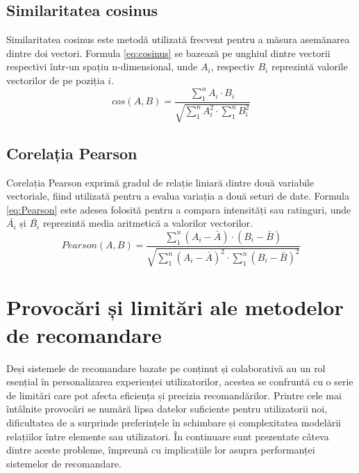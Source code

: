 \subsection{Similaritatea cosinus}
\label{subsec:ch3sec3sub2}
Similaritatea cosinus \cite{al2018similarity} este metodă utilizată frecvent pentru a măsura asemănarea dintre doi vectori. 
Formula \ref{eq:cosinus} se bazează pe unghiul dintre vectorii respectivi într-un spațiu n-dimensional, unde \(A_i\), respectiv \(B_i\) reprezintă valorile vectorilor de pe poziția \(i\).
\begin{equation}
    cos(A, B) = \frac{\sum_1^n A_i \cdot B_i}{\sqrt{\sum_1^n A_i^2 \cdot \sum_1^n B_i^2}}
    \label{eq:cosinus}
\end{equation}

\subsection{Corelația Pearson}
\label{subsec:ch3sec3sub3}
Corelația Pearson \cite{al2018similarity} exprimă gradul de relație liniară dintre două variabile vectoriale, fiind utilizată pentru a evalua variația a două seturi de date.
Formula \ref{eq:Pearson} este adesea folosită pentru a compara intensități sau ratinguri, unde \(\bar{A_i}\) și \(\bar{B_i}\) reprezintă media aritmetică a valorilor vectorilor.
\begin{equation}
    Pearson(A, B) = \frac{\sum_1^n (A_i - \bar{A}) \cdot (B_i - \bar{B})}{\sqrt{\sum_1^n (A_i - \bar{A})^2 \cdot \sum_1^n (B_i - \bar{B})^2}}
    \label{eq:Pearson}
\end{equation}


\section{Provocări și limitări ale metodelor de recomandare}
\label{sec:ch3sec4}
Deși sistemele de recomandare bazate pe conținut și colaborativă au un rol esențial în personalizarea experienței utilizatorilor, acestea se confruntă cu o serie de limitări care pot afecta eficiența și precizia recomandărilor. 
Printre cele mai întâlnite provocări se numără lipsa datelor suficiente pentru utilizatorii noi, dificultatea de a surprinde preferințele în schimbare și complexitatea modelării relațiilor între elemente sau utilizatori. 
În continuare sunt prezentate câteva dintre aceste probleme, împreună cu implicațiile lor asupra performanței sistemelor de recomandare.

